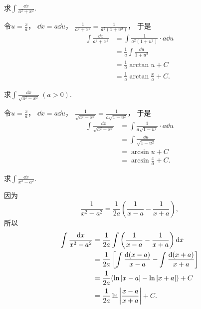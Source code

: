 \begin{example}
求\(\int \frac{\dd{x}}{a^2+x^2}\).
\begin{solution}
令\(u=\frac{x}{a}\)，
\(\dd{x}=a\dd{u}\)，
\(\frac{1}{a^2+x^2}
= \frac{1}{a^2(1+u^2)}\)，
于是\begin{align}
	\int \frac{\dd{x}}{a^2+x^2}
	&= \int \frac{1}{a^2(1+u^2)} \cdot a\dd{u}
		\nonumber \\
	&= \frac{1}{a} \int \frac{\dd{u}}{1+u^2}
		\nonumber \\
	&= \frac{1}{a} \arctan u + C
		\nonumber \\
	&= \frac{1}{a} \arctan\frac{x}{a} + C.
\end{align}
\end{solution}
\end{example}

\begin{example}
求\(\int \frac{\dd{x}}{\sqrt{a^2-x^2}}\ (a>0)\).
\begin{solution}
令\(u=\frac{x}{a}\)，
\(\dd{x}=a\dd{u}\)，
\(\frac{1}{\sqrt{a^2-x^2}}
= \frac{1}{a\sqrt{1-u^2}}\)，
于是\begin{align}
	\int \frac{\dd{x}}{\sqrt{a^2-x^2}}
	&= \int \frac{1}{a\sqrt{1-u^2}} \cdot a\dd{u}
		\nonumber \\
	&= \int \frac{\dd{u}}{\sqrt{1-u^2}}
		\nonumber \\
	&= \arcsin u + C
		\nonumber \\
	&= \arcsin\frac{x}{a} + C.
\end{align}
\end{solution}
\end{example}

\begin{example}
求\(\int \frac{\dd{x}}{x^2 - a^2}\).
\begin{solution}
因为\[
	\frac{1}{x^2 - a^2}
	= \frac{1}{2a} \left(\frac{1}{x-a} - \frac{1}{x+a}\right),
\]
所以\begin{align}
	\int \frac{\dd{x}}{x^2 - a^2}
	&= \frac{1}{2a} \int \left(\frac{1}{x-a} - \frac{1}{x+a}\right) \dd{x}
		\nonumber \\
	&= \frac{1}{2a} \left[ \int \frac{\dd(x-a)}{x-a} - \int \frac{\dd(x+a)}{x+a} \right]
		\nonumber \\
	&= \frac{1}{2a} ( \ln\abs{x-a} - \ln\abs{x+a} ) + C
		\nonumber \\
	&= \frac{1}{2a} \ln\abs{\frac{x-a}{x+a}} + C.
\end{align}
\end{solution}
\end{example}

